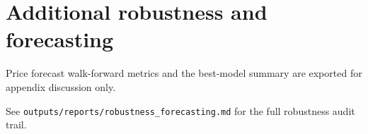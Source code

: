\section{Additional robustness and forecasting}
\label{app:robustness}

Price forecast walk-forward metrics and the best-model summary are exported for appendix
discussion only.


See \texttt{outputs/reports/robustness\_forecasting.md} for the full robustness audit trail.
